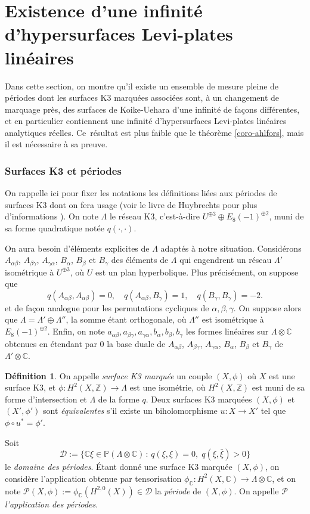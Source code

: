 \documentclass[JEP,XML,SOM,Unicode,francais,published]{cedram}
\newcommand{\Z}{\mathbb{Z}}
\newcommand{\C}{\mathbb{C}}
\theoremstyle{definition}
\newtheorem{defn}[thm]{Définition}
\begin{document}
\section{Existence d'une infinité d'hypersurfaces Levi-plates linéaires}
\label{section:infinite-hlpl}
Dans cette section, on montre qu'il existe un ensemble de mesure pleine de pério\-des dont les surfaces K3 marquées associées sont, à un changement de marquage près, des surfaces de Koike-Uehara d'une infinité de façons différentes, et en particulier contiennent une infinité d'hypersurfaces Levi-plates linéaires analytiques réelles. Ce~résultat est plus faible que le théorème \ref{coro-ahlfors}, mais il est nécessaire à sa preuve.
\subsubsection*{Surfaces K3 et périodes}
On rappelle ici pour fixer les notations les définitions liées aux périodes de surfaces K3 dont on fera usage (voir le livre de Huybrechts pour plus d'informations \cite[chap.\,6 \& 7]{huybrechts_2016}). On note $\Lambda$ le réseau K3, c'est-à-dire $U^{\oplus 3} \oplus E_{8}(-1)^{\oplus 2}$,
muni de sa forme quadratique notée $q(\cdot, \cdot)$.

On aura besoin d'éléments explicites de $\Lambda$ adaptés à notre situation. Considérons $A_{\alpha\beta}$, $A_{\beta\gamma}$, $A_{\gamma\alpha}$, $B_\alpha$, $B_\beta$ et $B_\gamma$ des éléments de $\Lambda$ qui engendrent un réseau $\Lambda'$ isométrique à $U^{\oplus 3}$, où $U$ est un plan hyperbolique. Plus précisément, on suppose que
\[
q(A_{\alpha\beta}, A_{\alpha\beta}) = 0, \quad
q(A_{\alpha\beta}, B_{\gamma}) = 1, \quad
q(B_{\gamma}, B_\gamma) = -2.
\]
et de façon analogue pour les permutations cycliques de $\alpha, \beta, \gamma$. On suppose alors que $\Lambda = \Lambda' \oplus \Lambda''$, la somme étant orthogonale, où $\Lambda''$ est isométrique à $E_{8}(-1)^{\oplus 2}$. Enfin, on note $a_{\alpha\beta}, a_{\beta\gamma},a_{\gamma\alpha}, b_\alpha,b_\beta, b_{\gamma}$ les formes linéaires sur $\Lambda\otimes\C$ obtenues en étendant par $0$ la base duale de $A_{\alpha\beta}$, $A_{\beta\gamma}$, $A_{\gamma\alpha}$, $B_\alpha$, $B_\beta$ et $B_\gamma$ de $\Lambda'\otimes\C$.

\begin{defn}On appelle \emph{surface K3 marquée} un couple $(X, \phi)$ où $X$ est une surface K3, et $\phi \colon H^2(X, \Z) \to \Lambda$ est une isométrie, où $H^2(X, \Z)$ est muni de sa forme d'intersection et $\Lambda$ de la forme $q$. Deux surfaces K3 marquées $(X, \phi)$ et $(X', \phi')$ sont \emph{équivalentes} s'il existe un biholomorphisme $u \colon X \to X'$ tel que $\phi \circ u^* = \phi'$.

Soit
\[\mathscr{D}:= \{\C\xi \in \mathbb{P}(\Lambda \otimes\C)\,:\,q(\xi, \xi) = 0,\;q(\xi, \bar{\xi}) > 0\}\]
le \emph{domaine des périodes}. Étant donné une surface K3 marquée $(X, \phi)$, on considère l'application obtenue par tensorisation $\phi_\C \colon H^2(X, \C) \to \Lambda\otimes\C$, et on note $\mathscr{P}(X, \phi):= \phi_\C(H^{2, 0}(X)) \in \mathscr{D}$ la \emph{période} de $(X, \phi)$. On appelle $\mathscr{P}$ \emph{l'application des périodes}.
\end{defn}
\end{document}

